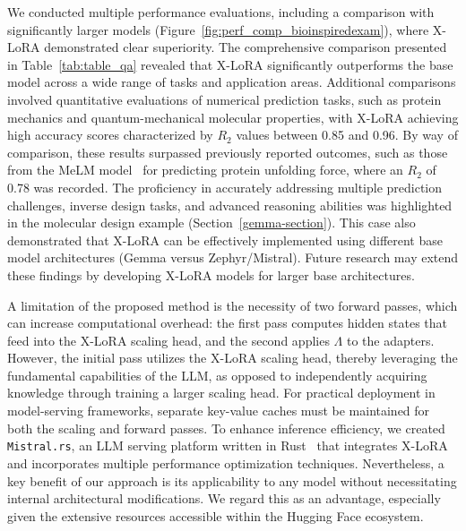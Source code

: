 We conducted multiple performance evaluations, including a comparison with significantly larger models (Figure~\ref{fig:perf_comp_bioinspiredexam}), where X-LoRA demonstrated clear superiority. The comprehensive comparison presented in Table~\ref{tab:table_qa} revealed that X-LoRA significantly outperforms the base model across a wide range of tasks and application areas. Additional comparisons involved quantitative evaluations of numerical prediction tasks, such as protein mechanics and quantum-mechanical molecular properties, with X-LoRA achieving high accuracy scores characterized by $R_2$ values between 0.85 and 0.96. By way of comparison, these results surpassed previously reported outcomes, such as those from the MeLM model~\cite{Buehler2023MeLMProblemsb} for predicting protein unfolding force, where an $R_2$ of 0.78 was recorded. The proficiency in accurately addressing multiple prediction challenges, inverse design tasks, and advanced reasoning abilities was highlighted in the molecular design example (Section~\ref{gemma-section}). This case also demonstrated that X-LoRA can be effectively implemented using different base model architectures (Gemma versus Zephyr/Mistral). Future research may extend these findings by developing X-LoRA models for larger base architectures.

A limitation of the proposed method is the necessity of two forward passes, which can increase computational overhead: the first pass computes hidden states that feed into the X-LoRA scaling head, and the second applies $\Lambda$ to the adapters. However, the initial pass utilizes the X-LoRA scaling head, thereby leveraging the fundamental capabilities of the LLM, as opposed to independently acquiring knowledge through training a larger scaling head. For practical deployment in model-serving frameworks, separate key-value caches must be maintained for both the scaling and forward passes. To enhance inference efficiency, we created \texttt{Mistral.rs}, an LLM serving platform written in Rust~\cite{matsakis2014rust} that integrates X-LoRA and incorporates multiple performance optimization techniques. Nevertheless, a key benefit of our approach is its applicability to any model without necessitating internal architectural modifications. We regard this as an advantage, especially given the extensive resources accessible within the Hugging Face ecosystem.

